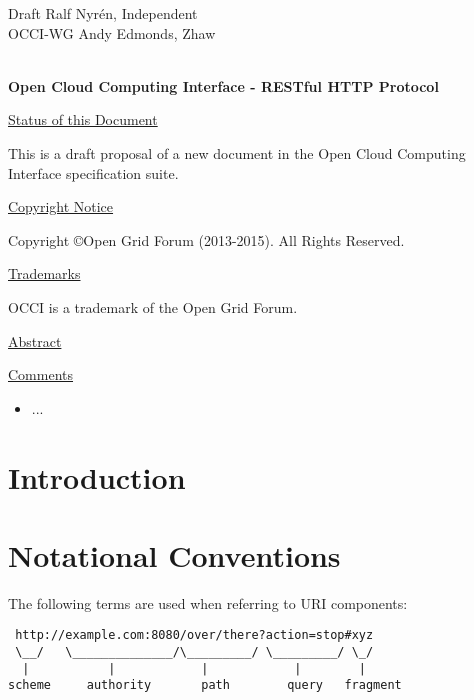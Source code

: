 \documentclass[10pt,a4paper]{article}
\begin{document}
\thispagestyle{empty}

Draft \hfill Ralf Nyrén, Independent \\
OCCI-WG \hfill Andy Edmonds, Zhaw \\
\\

\vspace*{0.5in}

\begin{Large}
\textbf{Open Cloud Computing Interface - RESTful HTTP Protocol}
\end{Large}

\vspace*{0.5in}

\underline{Status of this Document}

%
This is a draft proposal of a new document in the Open Cloud Computing
Interface specification suite.

\underline{Copyright Notice}

Copyright \copyright Open Grid Forum (2013-2015). All Rights Reserved.

\underline{Trademarks}

OCCI is a trademark of the Open Grid Forum.

\underline{Abstract}



\underline{Comments}
\begin{itemize}
\item ...
\end{itemize}

\newpage
\tableofcontents
\newpage

\section{Introduction}
%

\section{Notational Conventions}


The following terms \cite{rfc3986} are used when referring to URI
components:

\begin{verbatim}
 http://example.com:8080/over/there?action=stop#xyz
 \__/   \______________/\_________/ \_________/ \_/
  |           |            |            |        |
scheme     authority       path        query   fragment
\end{verbatim}
\end{document}
